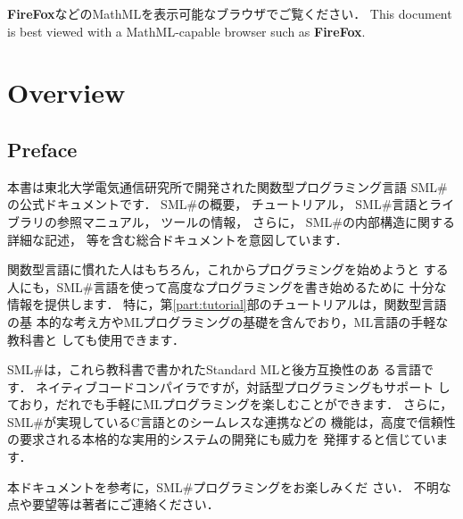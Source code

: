 \documentclass{jbook}
\date{\today}
\title{\txt{プログラミング言語\smlsharp{}解説}{\smlsharp{} Document}}
\author{
\authors
}
\newcommand{\txt}[2]{#2}
\newcommand{\smlsharp}{SML\#}
\begin{document}
\maketitle
 
\tableofcontents

\ifjp%
{\bf FireFox}などのMathMLを表示可能なブラウザでご覧ください．
\else%
This document is best viewed with a MathML-capable browser such as {\bf FireFox}.
\fi%

\setcounter{page}{1}

\part{\txt{概要}{Overview}}
\label{part:outline}

\chapter{\txt{はじめに}{Preface}}

\ifjp%
	本書は東北大学電気通信研究所で開発された関数型プログラミング言語
\smlsharp{}の公式ドキュメントです．
	\smlsharp{}の概要，
チュートリアル，
\smlsharp{}言語とライブラリの参照マニュアル，
ツールの情報，
さらに，
\smlsharp{}の内部構造に関する詳細な記述，
等を含む総合ドキュメントを意図しています．

	関数型言語に慣れた人はもちろん，これからプログラミングを始めようと
する人にも，\smlsharp{}言語を使って高度なプログラミングを書き始めるために
十分な情報を提供します．
	特に，第\ref{part:tutorial}部のチュートリアルは，関数型言語の基
本的な考え方やMLプログラミングの基礎を含んでおり，ML言語の手軽な教科書と
しても使用できます．
  
	\smlsharp{}は，これら教科書で書かれたStandard MLと後方互換性のあ
る言語です．
	ネイティブコードコンパイラですが，対話型プログラミングもサポート
しており，だれでも手軽にMLプログラミングを楽しむことができます．
	さらに，\smlsharp{}が実現しているC言語とのシームレスな連携などの
機能は，高度で信頼性の要求される本格的な実用的システムの開発にも威力を
発揮すると信じています． 
  
	本ドキュメントを参考に，\smlsharp{}プログラミングをお楽しみくだ
さい． 
	不明な点や要望等は著者にご連絡ください．
\end{document}
